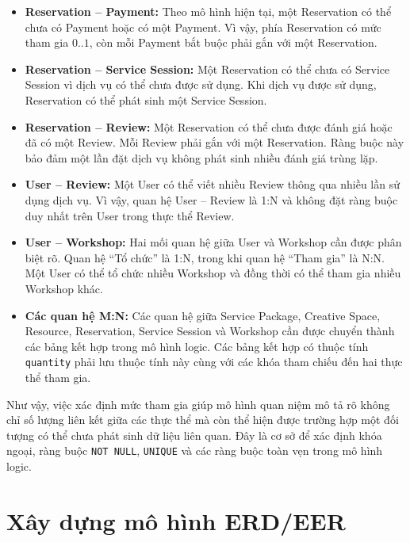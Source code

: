 \begin{itemize}

\item \textbf{Reservation -- Payment:} Theo mô hình hiện tại, một Reservation có thể chưa có Payment hoặc có một Payment. Vì vậy, phía Reservation có mức tham gia $0..1$, còn mỗi Payment bắt buộc phải gắn với một Reservation.

\item \textbf{Reservation -- Service Session:} Một Reservation có thể chưa có Service Session vì dịch vụ có thể chưa được sử dụng. Khi dịch vụ được sử dụng, Reservation có thể phát sinh một Service Session.

\item \textbf{Reservation -- Review:} Một Reservation có thể chưa được đánh giá hoặc đã có một Review. Mỗi Review phải gắn với một Reservation. Ràng buộc này bảo đảm một lần đặt dịch vụ không phát sinh nhiều đánh giá trùng lặp.

\item \textbf{User -- Review:} Một User có thể viết nhiều Review thông qua nhiều lần sử dụng dịch vụ. Vì vậy, quan hệ User -- Review là 1:N và không đặt ràng buộc duy nhất trên User trong thực thể Review.

\item \textbf{User -- Workshop:} Hai mối quan hệ giữa User và Workshop cần được phân biệt rõ. Quan hệ ``Tổ chức'' là 1:N, trong khi quan hệ ``Tham gia'' là N:N. Một User có thể tổ chức nhiều Workshop và đồng thời có thể tham gia nhiều Workshop khác.

\item \textbf{Các quan hệ M:N:} Các quan hệ giữa Service Package, Creative Space, Resource, Reservation, Service Session và Workshop cần được chuyển thành các bảng kết hợp trong mô hình logic. Các bảng kết hợp có thuộc tính \texttt{quantity} phải lưu thuộc tính này cùng với các khóa tham chiếu đến hai thực thể tham gia.

\end{itemize}

Như vậy, việc xác định mức tham gia giúp mô hình quan niệm mô tả rõ không chỉ số lượng liên kết giữa các thực thể mà còn thể hiện được trường hợp một đối tượng có thể chưa phát sinh dữ liệu liên quan. Đây là cơ sở để xác định khóa ngoại, ràng buộc \texttt{NOT NULL}, \texttt{UNIQUE} và các ràng buộc toàn vẹn trong mô hình logic.

\section{Xây dựng mô hình ERD/EER}

